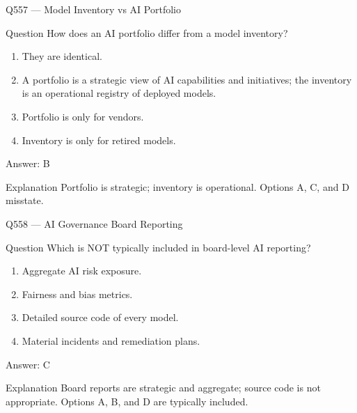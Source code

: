 \documentclass[aspectratio=169,8pt]{beamer}
\begin{document}
	\begin{frame}{Q557 --- Model Inventory vs AI Portfolio}
		\begin{block}{Question}
			How does an AI portfolio differ from a model inventory?
			\begin{enumerate}
				\item They are identical.
				\item A portfolio is a strategic view of AI capabilities and initiatives; the inventory is an operational registry of deployed models.
				\item Portfolio is only for vendors.
				\item Inventory is only for retired models.
			\end{enumerate}
		\end{block}
		\begin{exampleblock}{Answer: B}\end{exampleblock}
		\begin{block}{Explanation}
			Portfolio is strategic; inventory is operational. Options A, C, and D misstate.
		\end{block}
	\end{frame}
	
	\begin{frame}{Q558 --- AI Governance Board Reporting}
		\begin{block}{Question}
			Which is NOT typically included in board-level AI reporting?
			\begin{enumerate}
				\item Aggregate AI risk exposure.
				\item Fairness and bias metrics.
				\item Detailed source code of every model.
				\item Material incidents and remediation plans.
			\end{enumerate}
		\end{block}
		\begin{exampleblock}{Answer: C}\end{exampleblock}
		\begin{block}{Explanation}
			Board reports are strategic and aggregate; source code is not appropriate. Options A, B, and D are typically included.
		\end{block}
	\end{frame}
	
\end{document}

